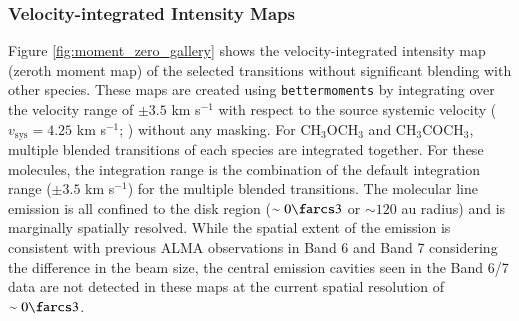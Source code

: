 \documentclass[linenumbers, twocolumn, twocolappendix, astrosymb, times]{aastex631}
\newcommand{\dimethylether}{CH$_3$OCH$_3$\xspace}
\newcommand{\acetone}{CH$_3$COCH$_3$\xspace}
\begin{document}
\subsubsection{Velocity-integrated Intensity Maps}
Figure \ref{fig:moment_zero_gallery} shows the velocity-integrated intensity map (zeroth moment map) of the selected transitions without significant blending with other species. These maps are created using \texttt{bettermoments} \citep{bettermoments} by integrating over the velocity range of $\pm3.5$ km s$^{-1}$ with respect to the source systemic velocity ($v_\mathrm{sys} = 4.25$ km s$^{-1}$; \citealt{Tobin2023}) without any masking. For \dimethylether and \acetone, multiple blended transitions of each species are integrated together. For these molecules, the integration range is the combination of the default integration range ($\pm3.5$ km s$^{-1}$) for the multiple blended transitions. The molecular line emission is all confined to the disk region ($\sim0\farcs3$ or $\sim120$ au radius) and is marginally spatially resolved. While the spatial extent of the emission is consistent with previous ALMA observations in Band 6 and Band 7 \citep{vantHoff2018, Lee2019, Tobin2023} considering the difference in the beam size, the central emission cavities seen in the Band 6/7 data are not detected in these maps at the current spatial resolution of $\sim0\farcs3$.
\end{document}
